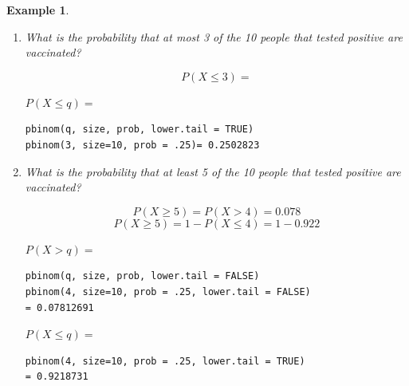 \documentclass[12pt]{amsart}
\newtheorem{example}[theorem]{Example}
\begin{document}
{\begin{example}
\begin{enumerate}
\item What is the probability that at most 3 of the 10 people that tested positive are vaccinated?

\color{blue}
$$
P(X \leq 3) = 
$$
\vspace{1cm}

$P(X \leq q) =$
\begin{verbatim}
pbinom(q, size, prob, lower.tail = TRUE) 
pbinom(3, size=10, prob = .25)= 0.2502823
\end{verbatim}
\color{black}

\vspace{4cm}

\item What is the probability that at least 5 of the 10 people that tested positive are vaccinated?

\color{blue}
$$
P(X \geq 5) = P(X > 4) = 0.078
$$
$$
P(X \geq 5) = 1 - P(X \leq 4) = 1- 0.922
$$
\vspace{1cm}

$P(X > q) =$
\begin{verbatim}
pbinom(q, size, prob, lower.tail = FALSE) 
pbinom(4, size=10, prob = .25, lower.tail = FALSE) 
= 0.07812691
\end{verbatim}
$P(X \leq q) =$
\begin{verbatim}
pbinom(4, size=10, prob = .25, lower.tail = TRUE) 
= 0.9218731
\end{verbatim}
\color{black}



\end{enumerate}

\end{example} 









}  %
\end{document}
